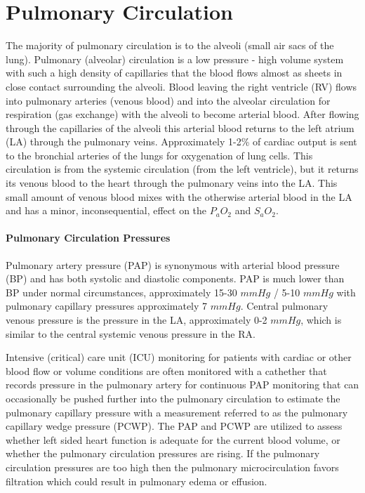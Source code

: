 \section{Pulmonary Circulation}

The majority of pulmonary circulation is to the alveoli (small air sacs of the lung). Pulmonary (alveolar) circulation is a low pressure - high volume system with such a high density of capillaries that the blood flows almost as sheets in close contact surrounding the alveoli. Blood leaving the right ventricle (RV) flows into pulmonary arteries (venous blood) and into the alveolar circulation for respiration (gas exchange) with the alveoli to become arterial blood. After flowing through the capillaries of the alveoli this arterial blood returns to the left atrium (LA) through the pulmonary veins. 
Approximately 1-2\% of cardiac output is sent to the bronchial arteries of the lungs for oxygenation of lung cells. This circulation is from the systemic circulation (from the left ventricle), but it returns its venous blood to the heart through the pulmonary veins into the LA. This small amount of venous blood mixes with the otherwise arterial blood in the LA and has a minor, inconsequential, effect on the $P_aO_2$ and $S_aO_2$.

\paragraph{Pulmonary Circulation Pressures}

Pulmonary artery pressure (PAP) is synonymous with arterial blood pressure (BP) and has both systolic and diastolic components. PAP is much lower than BP under normal circumstances, approximately 15-30 $mmHg$ / 5-10 $mmHg$ with pulmonary capillary pressures approximately 7 $mmHg$. Central pulmonary venous pressure is the pressure in the LA, approximately 0-2 $mmHg$, which is similar to the central systemic venous pressure in the RA. 

Intensive (critical) care unit (ICU) monitoring for patients with cardiac or other blood flow or volume conditions are often monitored with a cathether that records pressure in the pulmonary artery for continuous PAP monitoring that can occasionally be pushed further into the pulmonary circulation to estimate the pulmonary capillary pressure with a measurement referred to as the pulmonary capillary wedge pressure (PCWP). The PAP and PCWP are utilized to assess whether left sided heart function is adequate for the current blood volume, or whether the pulmonary circulation pressures are rising. If the pulmonary circulation pressures are too high then the pulmonary microcirculation favors filtration which could result in pulmonary edema or effusion.

